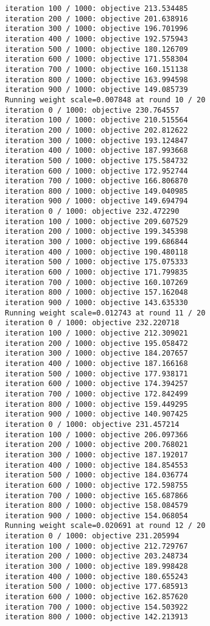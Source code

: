 \documentclass[11pt]{article}
\begin{document}
\begin{Verbatim}[commandchars=\\\{\}]
iteration 100 / 1000: objective 213.534485
iteration 200 / 1000: objective 201.638916
iteration 300 / 1000: objective 196.701996
iteration 400 / 1000: objective 192.575943
iteration 500 / 1000: objective 180.126709
iteration 600 / 1000: objective 171.558304
iteration 700 / 1000: objective 160.151138
iteration 800 / 1000: objective 163.994598
iteration 900 / 1000: objective 149.085739
Running weight scale=0.007848 at round 10 / 20
iteration 0 / 1000: objective 230.764557
iteration 100 / 1000: objective 210.515564
iteration 200 / 1000: objective 202.812622
iteration 300 / 1000: objective 193.124847
iteration 400 / 1000: objective 187.993668
iteration 500 / 1000: objective 175.584732
iteration 600 / 1000: objective 172.952744
iteration 700 / 1000: objective 166.806870
iteration 800 / 1000: objective 149.040985
iteration 900 / 1000: objective 149.694794
iteration 0 / 1000: objective 232.472290
iteration 100 / 1000: objective 209.607529
iteration 200 / 1000: objective 199.345398
iteration 300 / 1000: objective 199.686844
iteration 400 / 1000: objective 190.480118
iteration 500 / 1000: objective 175.075333
iteration 600 / 1000: objective 171.799835
iteration 700 / 1000: objective 160.107269
iteration 800 / 1000: objective 157.162048
iteration 900 / 1000: objective 143.635330
Running weight scale=0.012743 at round 11 / 20
iteration 0 / 1000: objective 232.220718
iteration 100 / 1000: objective 212.309021
iteration 200 / 1000: objective 195.058472
iteration 300 / 1000: objective 184.207657
iteration 400 / 1000: objective 187.166168
iteration 500 / 1000: objective 177.938171
iteration 600 / 1000: objective 174.394257
iteration 700 / 1000: objective 172.842499
iteration 800 / 1000: objective 159.449295
iteration 900 / 1000: objective 140.907425
iteration 0 / 1000: objective 231.457214
iteration 100 / 1000: objective 206.097366
iteration 200 / 1000: objective 200.768021
iteration 300 / 1000: objective 187.192017
iteration 400 / 1000: objective 184.854553
iteration 500 / 1000: objective 184.036774
iteration 600 / 1000: objective 172.598755
iteration 700 / 1000: objective 165.687866
iteration 800 / 1000: objective 158.084579
iteration 900 / 1000: objective 154.068054
Running weight scale=0.020691 at round 12 / 20
iteration 0 / 1000: objective 231.205994
iteration 100 / 1000: objective 212.729767
iteration 200 / 1000: objective 203.248734
iteration 300 / 1000: objective 189.998428
iteration 400 / 1000: objective 180.655243
iteration 500 / 1000: objective 177.685913
iteration 600 / 1000: objective 162.857620
iteration 700 / 1000: objective 154.503922
iteration 800 / 1000: objective 142.213913

\end{Verbatim}
\end{document}
